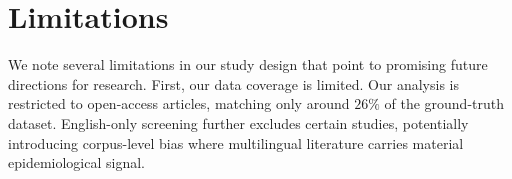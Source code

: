 \section{Limitations}




We note several limitations in our study design that point to promising future directions for research. First, our data coverage is limited. Our analysis is restricted to open-access articles, matching only around $26\%$ of the ground-truth dataset. English-only screening further excludes certain studies, potentially introducing corpus-level bias where multilingual literature carries material epidemiological signal.%

